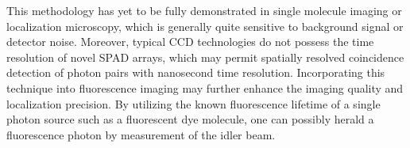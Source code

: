 This methodology has yet to be fully demonstrated in single molecule imaging or localization microscopy, which is generally quite sensitive to background signal or detector noise. Moreover, typical CCD	 technologies do not possess the time resolution of novel SPAD arrays, which may permit spatially resolved coincidence detection of photon pairs with nanosecond time resolution. Incorporating this technique into fluorescence imaging may further enhance the imaging quality and localization precision. By utilizing the known fluorescence lifetime of a single photon source such as a fluorescent dye molecule, one can possibly herald a fluorescence photon by measurement of the idler beam.

